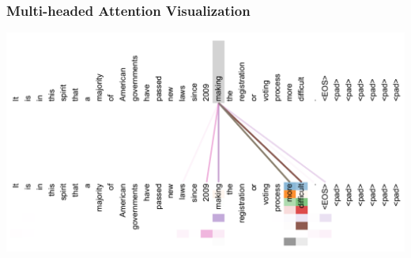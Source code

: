 \documentclass[10pt]{beamer}
\begin{document}
\begin{frame}
  \frametitle{Multi-headed Attention Visualization}
\begin{center}
	\includegraphics[width=.9\columnwidth]{images/attnA}
\end{center}
\end{frame}
\end{document}
